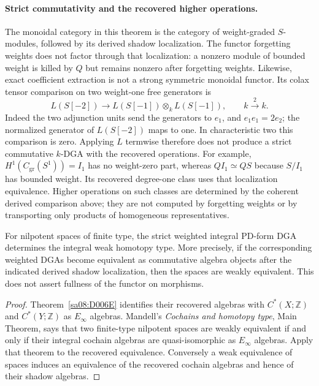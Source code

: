 \paragraph{Strict commutativity and the recovered higher operations.}
The monoidal category in this theorem is the category of weight-graded
$S$-modules, followed by its derived shadow localization. The functor
forgetting weights does not factor through that localization: a nonzero
module of bounded weight is killed by $Q$ but remains nonzero after
forgetting weights. Likewise, exact coefficient extraction is not a
strong symmetric monoidal functor. Its colax tensor comparison on two
weight-one free generators is
\[
 L(S[-2])\longrightarrow L(S[-1])\otimes_k L(S[-1]),
 \qquad k\xrightarrow{\ 2\ }k.
\]
Indeed the two adjunction units send the generators to $e_1$, and
$e_1e_1=2e_2$; the normalized generator of $L(S[-2])$ maps to one.
In characteristic two this comparison is zero. Applying $L$ termwise
therefore does not produce a strict commutative $k$-DGA with the
recovered operations. For example,
$H^1(C_{\mathrm{gr}}(S^1))=I_1$ has no weight-zero part, whereas
$QI_1\simeq QS$ because $S/I_1$ has bounded weight. Its recovered
degree-one class uses that localization equivalence. Higher operations
on such classes are determined by the coherent derived comparison
above; they are not computed by forgetting weights or by transporting
only products of homogeneous representatives.

\begin{corollary}\label{sa08:D006M}
For nilpotent spaces of finite type, the strict weighted integral
PD-form DGA determines the integral weak homotopy type. More
precisely, if the corresponding weighted DGAs become equivalent as
commutative algebra objects after the indicated derived shadow
localization, then the spaces are weakly equivalent. This does not
assert fullness of the functor on morphisms.
\end{corollary}
\begin{proof}
Theorem~\ref{sa08:D006E} identifies their recovered algebras with
$C^*(X;\mathbb Z)$ and $C^*(Y;\mathbb Z)$ as $E_\infty$ algebras.
Mandell's \emph{Cochains and homotopy type}, Main Theorem, says that
two finite-type nilpotent spaces are weakly equivalent if and only
if their integral cochain algebras are quasi-isomorphic as
$E_\infty$ algebras. Apply that theorem to the recovered equivalence.
Conversely a weak equivalence of spaces induces an equivalence of
the recovered cochain algebras and hence of their shadow algebras.
\end{proof}


